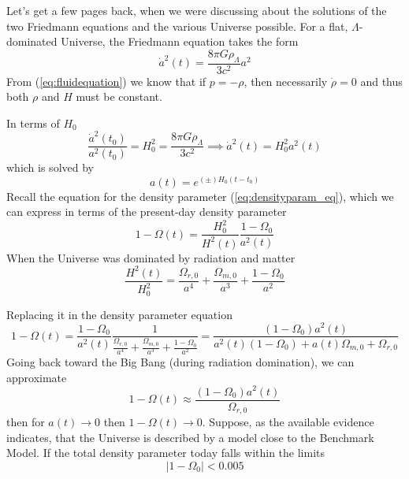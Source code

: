 Let's get a few pages back, when we were discussing about the solutions of the two Friedmann equations and the various Universe possible. For a flat, $\Lambda$-dominated Universe, the Friedmann equation takes
the form
\begin{equation*}
    \dot{a}^{2}(t) = \frac{8\pi G \rho_{\Lambda}}{3c^{2}}a^{2}
\end{equation*}
From (\ref{eq:fluidequation}) we know that if $p = -\rho$, then necessarily $\dot{\rho} = 0$ and thus both $\rho$ and $H$ must be constant.
\par In terms of $H_{0}$
\begin{equation*}
    \frac{\dot{a}^{2}(t_{0})}{a^{2}(t_{0})} = H_{0}^{2} = \frac{8\pi G \rho_{\Lambda}}{3c^{2}} \implies \dot{a}^{2}(t) = H_{0}^{2}a^{2}(t)
\end{equation*}
which is solved by 
\begin{equation}
    a(t) = e^{(\pm)H_{0}(t-t_{0})}
\end{equation}
Recall the equation for the density parameter (\ref{eq:densityparam_eq}), which we can express in terms of the present-day density parameter
\begin{equation*}
    1-\Omega(t) = \frac{H_{0}^{2}}{H^{2}(t)}\frac{1-\Omega_{0}}{a^{2}(t)}
\end{equation*}
When the Universe was dominated by radiation and matter
\begin{equation*}
    \frac{H^{2}(t)}{H_{0}^{2}} = \frac{\Omega_{r,0}}{a^{4}}+\frac{\Omega_{m,0}}{a^{3}}+\frac{1-\Omega_{0}}{a^{2}}
\end{equation*}
\par Replacing it in the density parameter equation
\begin{equation*}
     1-\Omega(t) = \frac{1-\Omega_{0}}{a^{2}(t)}\frac{1}{\frac{\Omega_{r,0}}{a^{4}}+\frac{\Omega_{m,0}}{a^{3}}+\frac{1-\Omega_{0}}{a^{2}}} = \frac{(1-\Omega_{0})a^{2}(t)}{a^{2}(t)(1-\Omega_{0})+a(t)\Omega_{m,0}+\Omega_{r,0}}
\end{equation*}
Going back toward the Big Bang (during radiation domination), we can approximate 
\begin{equation*}
    1-\Omega(t) \approx \frac{(1-\Omega_{0})a^{2}(t)}{\Omega_{r,0}}
\end{equation*}
then for $a(t)\to 0$ then $1-\Omega(t) \to 0$. Suppose, as the available evidence indicates, that the Universe is described by a model close to the Benchmark Model. If the total density parameter today falls within the limits
\begin{equation*}
    |1-\Omega_{0}|<0.005
\end{equation*}
